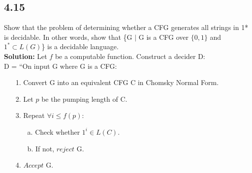 \subsection*{4.15} Show that the problem of determining whether a CFG generates all strings in 1* is decidable. In other words, show that \{\textlangle{}G\textrangle{} $|$ G is a CFG over $\{0, 1\}$ and $1^* \subset L(G)$\} is a decidable language. 
\\
\textbf{Solution:} Let $f$ be a computable function. Construct a decider D:
\\
D = ``On input \textlangle{}G\textrangle{} where G is a CFG:
\begin{enumerate}
\itemsep0em
\item[1.]Convert G into an equivalent CFG C in Chomsky Normal Form.
\item[2.]Let $p$ be the pumping length of C.
\item[3.]Repeat $\forall i \le f(p)$:
\begin{enumerate}
\item[a.]Check whether $1^i \in L(C)$.
\item[b.]If not, $reject$ \textlangle{}G\textrangle{}.
\end{enumerate}
\item[4.]$Accept$ \textlangle{}G\textrangle{}.
\end{enumerate}